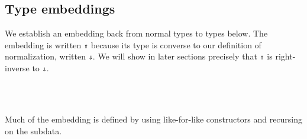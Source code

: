 \documentclass[authoryear, acmsmall, screen, review, nonacm]{acmart}
\begin{document}
\subsection{Type embeddings}

We establish an embedding back from normal types to types below. The embedding is written \verb!⇑! because its type is converse to our definition of normalization, written \verb!⇓!. We will show in later sections precisely that \verb!⇑! is right-inverse to \verb!⇓!.

\begin{code}%
\>[0]\AgdaSpace{}%
\AgdaSymbol{:}\AgdaSpace{}%
\AgdaSpace{}%
\AgdaSpace{}%
\AgdaSpace{}%
\AgdaSpace{}%
\AgdaSpace{}%
\AgdaSpace{}%
\<%
\\
\>[0]\AgdaSpace{}%
\AgdaSymbol{:}\AgdaSpace{}%
\AgdaSpace{}%
\AgdaSpace{}%
\AgdaSpace{}%
\AgdaSpace{}%
\AgdaSpace{}%
\AgdaSpace{}%
\<%
\\
\>[0]\AgdaSpace{}%
\AgdaSymbol{:}\AgdaSpace{}%
\AgdaSpace{}%
\AgdaSpace{}%
\AgdaOperator{\AgdaInductiveConstructor{R[}}\AgdaSpace{}%
\AgdaSpace{}%
\AgdaOperator{\AgdaInductiveConstructor{]}}\AgdaSpace{}%
\AgdaSpace{}%
\AgdaSpace{}%
\AgdaSpace{}%
\AgdaOperator{\AgdaInductiveConstructor{R[}}\AgdaSpace{}%
\AgdaSpace{}%
\AgdaOperator{\AgdaInductiveConstructor{]}}\<%
\end{code}

Much of the embedding is defined by using like-for-like constructors and recursing on the subdata.
\end{document}
